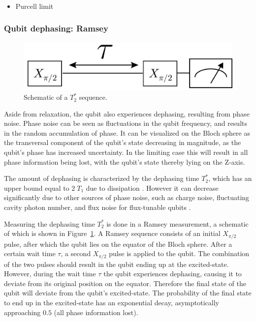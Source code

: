           \begin{itemize}
            \item Purcell limit
          \end{itemize}

        \subsubsection{Qubit dephasing: Ramsey}
          \label{sssec:Ramsey}

          \begin{figure}
            \begin{center}
            \vspace{-30pt}
              \includegraphics[width=\textwidth]{../Figures/Qubit characterization/T2 decoherence.png}
            \end{center}
            \vspace{-20 pt}
            \caption{Schematic of a $T_2^*$ sequence.}
            \label{fig:T2star schematic}
          \end{figure}

          Aside from relaxation, the qubit also experiences dephasing, resulting from phase noise. Phase noise can be seen as fluctuations in the qubit frequency, and results in the random accumulation of phase. It can be visualized on the Bloch sphere as the transversal component of the qubit's state decreasing in magnitude, as the qubit's phase has increased uncertainty. In the limiting case this will result in all phase information being lost, with the qubit's state thereby lying on the Z-axis.

          The amount of dephasing is characterized by the dephasing time $T_2^*$, which has an upper bound equal to $2\;T_1$ due to dissipation \cite[pp56-58]{Bishop}. However it can decrease significantly due to other sources of phase noise, such as charge noise, fluctuating cavity photon number, and flux noise for flux-tunable qubits \cite[p126]{Sears}.

          Measuring the dephasing time $T_2^*$ is done in a Ramsey measurement, a schematic of which is shown in Figure~\ref{fig:T2star schematic}. A Ramsey sequence consists of an initial $X_{\pi/2}$ pulse, after which the qubit lies on the equator of the Bloch sphere. After a certain wait time $\tau$, a second $X_{\pi/2}$ pulse is applied to the qubit. The combination of the two pulses should result in the qubit ending up at the excited-state. However, during the wait time $\tau$ the qubit experiences dephasing, causing it to deviate from its original position on the equator. Therefore the final state of the qubit will deviate from the qubit's excited-state. The probability of the final state to end up in the excited-state has an exponential decay, asymptotically approaching $0.5$ (all phase information lost).

